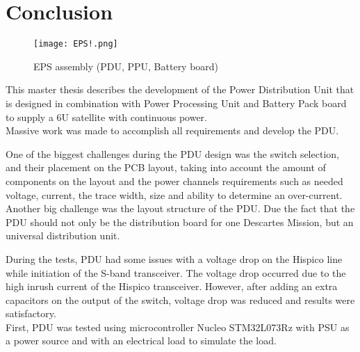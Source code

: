 \chapter{Conclusion\label{cha:chapter7}}

 \begin{figure}[h]
 	\centering
 	\texttt{[image: EPS!.png]}
 	\caption{EPS assembly (PDU, PPU, Battery board)}
 	\label{fig: EPS!}
 \end{figure}

This master thesis describes the development of the Power Distribution Unit that is designed in combination with Power Processing Unit and Battery Pack board to supply a 6U satellite with  continuous power.\\  


Massive work was made to accomplish all requirements and develop the PDU.
 

 One of the biggest challenges during the PDU design was the switch selection, and their placement on the PCB layout, taking into account the amount of components on the layout and the power channels requirements such as needed voltage, current, the trace width, size and ability to determine an over-current. Another big challenge was the layout structure of the PDU. Due the fact that the PDU should not only be the distribution board for one Descartes Mission, but an universal distribution unit. 
 
  During the tests, PDU had some issues with a voltage drop on the Hispico line while initiation of the S-band transceiver. The voltage drop occurred due to the high inrush current of the Hispico transceiver. However, after adding an extra capacitors on the output of the switch, voltage drop was reduced and results were satisfactory.    \\ 

First, PDU was tested using microcontroller Nucleo STM32L073Rz with PSU as a power source and with an electrical load to simulate the load. 

